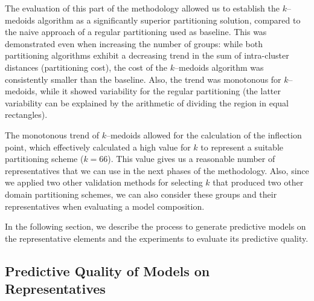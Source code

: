 The evaluation of this part of the methodology allowed us to establish the $k$--medoids algorithm as a significantly superior partitioning solution, compared to the naive approach of a regular partitioning used as baseline. This was demonstrated even when increasing the number of groups: while both partitioning algorithms exhibit a decreasing trend in the sum of intra-cluster distances (partitioning cost), the cost of the $k$--medoids algorithm was consistently smaller than the baseline. Also, the trend was monotonous for $k$--medoids, while it showed variability for the regular partitioning (the latter variability can be explained by the arithmetic of dividing the region in equal rectangles). 

The monotonous trend of $k$--medoids allowed for the calculation of the inflection point, which effectively calculated a high value for $k$ to represent a suitable partitioning scheme ($k = 66$). This value gives us a reasonable number of representatives that we can use in the next phases of the methodology. Also, since we applied two other validation methods for selecting $k$ that produced two other domain partitioning schemes, we can also consider these groups and their representatives when evaluating a model composition. 



In the following section, we describe the process to generate predictive models on the representative elements and the experiments to evaluate its predictive quality.

\subsection{Predictive Quality of Models on Representatives}
\label{Sec:AnalyzePredictorRepresentatives}

